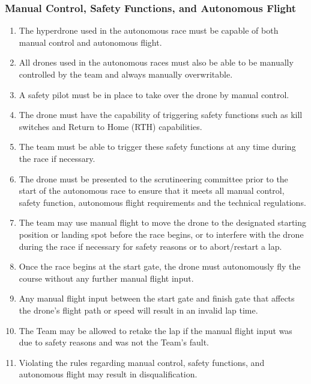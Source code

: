     \subsubsection{Manual Control, Safety Functions, and Autonomous Flight}
    \begin{enumerate}[resume]
    \item The hyperdrone used in the autonomous race must be capable of both manual control and autonomous flight.
    \item All drones used in the autonomous races must also be able to be manually controlled by the team and always manually overwritable.
    \item A safety pilot must be in place to take over the drone by manual control.
    \item The drone must have the capability of triggering safety functions such as kill switches and Return to Home (RTH) capabilities.
    \item The team must be able to trigger these safety functions at any time during the race if necessary.
    \item The drone must be presented to the scrutineering committee prior to the start of the autonomous race to ensure that it meets all manual control, safety function, autonomous flight requirements and the technical regulations.
    \item The team may use manual flight to move the drone to the designated starting position or landing spot before the race begins, or to interfere with the drone during the race if necessary for safety reasons or to abort/restart a lap.
    \item Once the race begins at the start gate, the drone must autonomously fly the course without any further manual flight input.
    \item Any manual flight input between the start gate and finish gate that affects the drone's flight path or speed will result in an invalid lap time.
    \item The Team may be allowed to retake the lap if the manual flight input was due to safety reasons and was not the Team's fault.
    \item Violating the rules regarding manual control, safety functions, and autonomous flight may result in disqualification.
    \end{enumerate}





